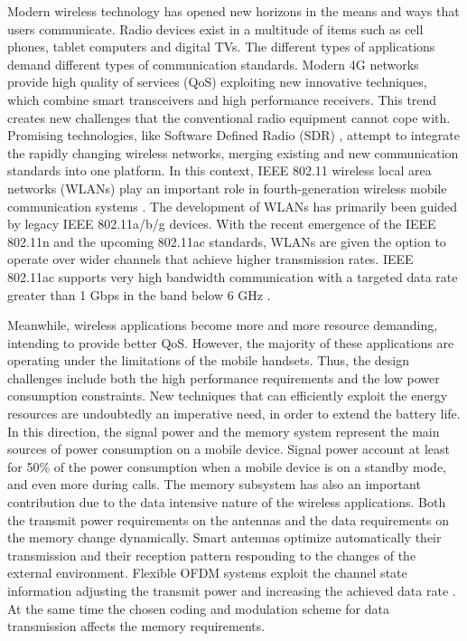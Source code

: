 Modern wireless technology \cite{1} has opened new horizons in the means and ways that users communicate. Radio devices exist in a multitude of items such as cell phones, tablet computers and digital TVs. The different types of applications demand different types of communication standards. Modern 4G networks provide high quality of services (QoS) exploiting new innovative techniques, which combine smart transceivers and high performance receivers. This trend creates new challenges that the conventional radio equipment cannot cope with. Promising technologies, like Software Defined Radio (SDR) \cite{2}, attempt to integrate the rapidly changing wireless networks, merging existing and new communication standards into one platform. In this context, IEEE 802.11 wireless local area networks (WLANs) play an important role in fourth-generation wireless mobile communication systems \cite{3}. The development of WLANs has primarily been guided by legacy IEEE 802.11a/b/g devices. With the recent emergence of the IEEE 802.11n and the upcoming 802.11ac standards, WLANs are given the option to operate over wider channels that achieve higher transmission rates. IEEE 802.11ac supports very high bandwidth communication with a targeted data rate greater than 1 Gbps in the band below 6 GHz \cite{4}.
	
Meanwhile, wireless applications become more and more resource demanding, intending to provide better QoS. However, the majority of these applications are operating under the limitations of the mobile handsets. Thus, the design challenges include both the high performance requirements and the low power consumption constraints. New techniques that can efficiently exploit the energy resources are undoubtedly an imperative need, in order to extend the battery life. In this direction, the signal power and the memory system represent the main sources of power consumption on a mobile device. Signal power account at least for 50\% of the power consumption when a mobile device is on a standby mode, and even more during calls. The memory subsystem has also an important contribution due to the data intensive nature of the wireless applications. Both the transmit power requirements on the antennas and the data requirements on the memory change dynamically. Smart antennas optimize automatically their transmission and their reception pattern responding to the changes of the external environment. Flexible OFDM systems exploit the channel state information adjusting the transmit power and increasing the achieved data rate \cite{5}\cite{6}. At the same time the chosen coding and modulation scheme for data transmission affects the memory requirements. 
	

